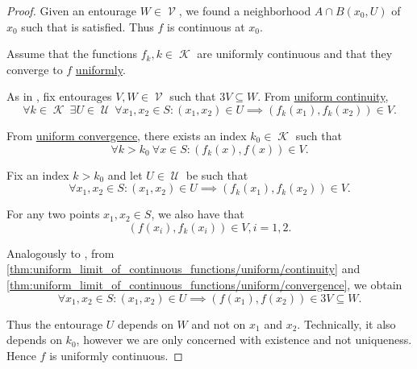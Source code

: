 \begin{proof}
  Given an entourage \( W \in \mscrV \), we found a neighborhood \( A \cap B(x_0, U) \) of \( x_0 \) such that  is satisfied. Thus \( f \) is continuous at \( x_0 \).

   Assume that the functions \( f_k, k \in \mscrK \) are uniformly continuous and that they converge to \( f \) \hyperref[def:function_net_convergence/locally_uniform]{uniformly}.

  As in , fix entourages \( V, W \in \mscrV \) such that \( 3V \subseteq W \). From \hyperref[def:uniform_continuity]{uniform continuity},
  \begin{equation*}
    \forall k \in \mscrK \ \exists U \in \mscrU \ \forall x_1, x_2 \in S : (x_1, x_2) \in U \implies (f_k(x_1), f_k(x_2)) \in V.
  \end{equation*}

  From \hyperref[def:function_net_convergence]{uniform convergence}, there exists an index \( k_0 \in \mscrK \) such that
  \begin{equation*}
    \forall k > k_0 \ \forall x \in S : (f_k(x), f(x)) \in V.
  \end{equation*}

  Fix an index \( k > k_0 \) and let \( U \in \mscrU \) be such that
  \begin{equation}\label{thm:uniform_limit_of_continuous_functions/uniform/continuity}
    \forall x_1, x_2 \in S : (x_1, x_2) \in U \implies (f_k(x_1), f_k(x_2)) \in V.
  \end{equation}

  For any two points \( x_1, x_2 \in S \), we also have that
  \begin{equation}\label{thm:uniform_limit_of_continuous_functions/uniform/convergence}
    (f(x_i), f_k(x_i)) \in V, i = 1, 2.
  \end{equation}

  Analogously to , from \eqref{thm:uniform_limit_of_continuous_functions/uniform/continuity} and \eqref{thm:uniform_limit_of_continuous_functions/uniform/convergence}, we obtain
  \begin{equation*}
    \forall x_1, x_2 \in S : (x_1, x_2) \in U \implies (f(x_1), f(x_2)) \in 3V \subseteq W.
  \end{equation*}

  Thus the entourage \( U \) depends on \( W \) and not on \( x_1 \) and \( x_2 \). Technically, it also depends on \( k_0 \), however we are only concerned with existence and not uniqueness. Hence \( f \) is uniformly continuous.
\end{proof}

